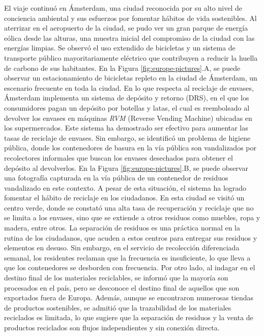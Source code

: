 El viaje continuó en Ámsterdam, una ciudad reconocida por su alto nivel de conciencia ambiental y sus esfuerzos por fomentar hábitos de vida sostenibles. Al aterrizar en el aeropuerto de la ciudad, se pudo ver un gran parque de energía eólica desde las alturas, una muestra inicial del compromiso de la ciudad con las energías limpias. Se observó el uso extendido de bicicletas y un sistema de transporte público mayoritariamente eléctrico que contribuyen a reducir la huella de carbono de sus habitantes. En la Figura \ref{fig:europe-pictures}.A, se puede observar un estacionamiento de bicicletas repleto en la ciudad de Ámsterdam, un escenario frecuente en toda la ciudad. En lo que respecta al reciclaje de envases, Ámsterdam implementa un sistema de depósito y retorno (DRS), en el que los consumidores pagan un depósito por botellas y latas, el cual es reembolsado al devolver los envases en máquinas \textit{RVM} (Reverse Vending Machine) ubicadas en los supermercados. Este sistema ha demostrado ser efectivo para aumentar las tasas de reciclaje de envases. Sin embargo, se identificó un problema de higiene pública, donde los contenedores de basura en la vía pública son vandalizados por recolectores informales que buscan los envases desechados para obtener el depósito al devolverlos. En la Figura \ref{fig:europe-pictures}.B, se puede observar una fotografía capturada en la vía pública de un contenedor de residuos vandalizado en este contexto. A pesar de esta situación, el sistema ha logrado fomentar el hábito de reciclaje en los ciudadanos. En esta ciudad se visitó un centro verde, donde se constató una alta tasa de recuperación y reciclaje que no se limita a los envases, sino que se extiende a otros residuos como muebles, ropa y madera, entre otros. La separación de residuos es una práctica normal en la rutina de los ciudadanos, que acuden a estos centros para entregar sus residuos y elementos en desuso. Sin embargo, en el servicio de recolección diferenciada semanal, los residentes reclaman que la frecuencia es insuficiente, lo que lleva a que los contenedores se desborden con frecuencia. Por otro lado, al indagar en el destino final de los materiales reciclables, se informó que la mayoría son procesados en el país, pero se desconoce el destino final de aquellos que son exportados fuera de Europa. Además, aunque se encontraron numerosas tiendas de productos sostenibles, se admitió que la trazabilidad de los materiales reciclados es limitada, lo que sugiere que la separación de residuos y la venta de productos reciclados son flujos independientes y sin conexión directa.

